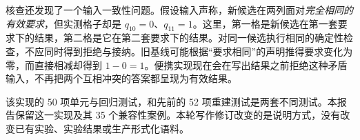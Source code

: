 核查还发现了一个输入一致性问题。假设输入声称，新候选在两列面对\emph{完全相同的有效要求}，但实测格子却是 $q_{10}=0$、$q_{11}=1$。这里，第一格是新候选在第一套要求下的结果，第二格是它在第二套要求下的结果。对同一候选执行相同的确定性检查，不应同时得到拒绝与接纳。旧基线可能根据“要求相同”的声明推得要求变化为零，而直接相减却得到 $1-0=1$。便携实现现在会在写出结果之前拒绝这种矛盾输入，不再把两个互相冲突的答案都呈现为有效结果。

该实现的 50 项单元与回归测试，和先前的 52 项重建测试是两套不同测试。本报告保留这一实现及其 35 个兼容性案例。本轮写作修订改变的是说明方式，没有改变已有实验、实验结果或生产形式化语料。
